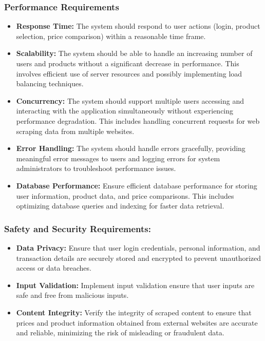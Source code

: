 \documentclass[a4paper,14pt,onecolumn]{report}
\begin{document}
	\subsubsection{Performance Requirements}
	\begin{itemize}
		\item \textbf{Response Time:} The system should respond to user actions (login, product selection, price comparison) within a reasonable time frame.
		\item \textbf{Scalability:} The system should be able to handle an increasing number of users and products without a significant decrease in performance. This involves efficient use of server resources and possibly implementing load balancing techniques.
		\item \textbf{Concurrency:} The system should support multiple users accessing and interacting with the application simultaneously without experiencing performance degradation. This includes handling concurrent requests for web scraping data from multiple websites.
		\item \textbf{Error Handling:} The system should handle errors gracefully, providing meaningful error messages to users and logging errors for system administrators to troubleshoot performance issues.
		\item \textbf{Database Performance:} Ensure efficient database performance for storing user information, product data, and price comparisons. This includes optimizing database queries and indexing for faster data retrieval.
	\end{itemize} 
	\subsubsection{Safety and Security Requirements:}
	\begin{itemize}
		\item \textbf{Data Privacy:} Ensure that user login credentials, personal information, and transaction details are securely stored and encrypted to prevent unauthorized access or data breaches.
		\item \textbf{Input Validation:} Implement input validation ensure that user inputs are safe and free from malicious inputs.
		\item \textbf{Content Integrity:} Verify the integrity of scraped content to ensure that prices and product information obtained from external websites are accurate and reliable, minimizing the risk of misleading or fraudulent data.
	\end{itemize}
	
\end{document}
